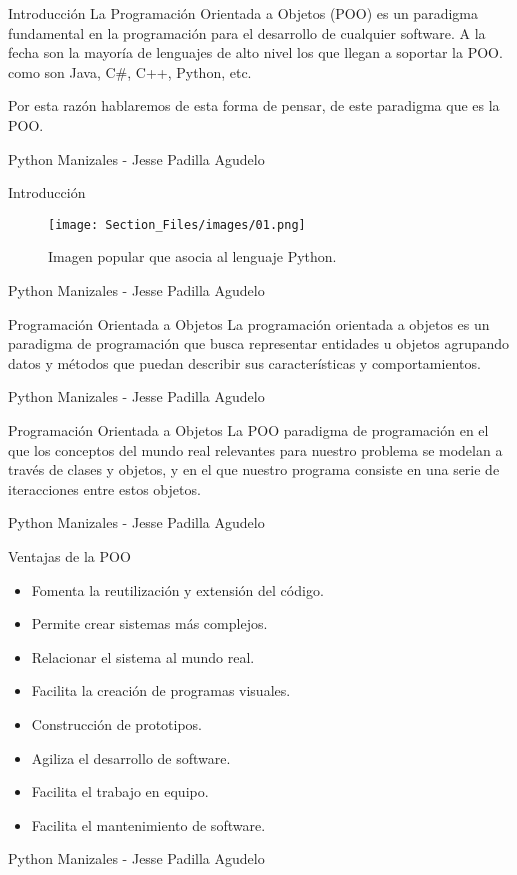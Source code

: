 \begin{frame}{Introducción}
\justifying
La Programación Orientada a Objetos (POO) es un paradigma fundamental en la programación para el desarrollo de cualquier software. A la fecha son la mayoría de lenguajes de alto nivel los que llegan a soportar la POO. como son Java, C\#, C++, Python, etc.

Por esta razón hablaremos de esta forma de pensar, de este paradigma que es la POO.

{\tiny Python Manizales - Jesse Padilla Agudelo}
\end{frame}

\begin{frame}{Introducción}
\justifying

\begin{figure}[H]
\centering
\texttt{[image: Section\_Files/images/01.png]}
\caption{Imagen popular que asocia al lenguaje Python.}
\end{figure}

{\tiny Python Manizales - Jesse Padilla Agudelo}
\end{frame}

\begin{frame}{Programación Orientada a Objetos}
\justifying
La programación orientada a objetos es un paradigma de programación que busca representar entidades u objetos agrupando datos y métodos que puedan describir sus características y comportamientos.

{\tiny Python Manizales - Jesse Padilla Agudelo}
\end{frame}

\begin{frame}{Programación Orientada a Objetos}
\justifying
La POO paradigma de programación en el que los conceptos del mundo real relevantes para nuestro problema se modelan a través de clases y objetos, y en el que nuestro programa consiste en una serie de iteracciones entre estos objetos.

{\tiny Python Manizales - Jesse Padilla Agudelo}
\end{frame}

\begin{frame}{Ventajas de la POO}
\justifying
\begin{itemize}
\item Fomenta la reutilización y extensión del código.
\item Permite crear sistemas más complejos.
\item Relacionar el sistema al mundo real.
\item Facilita la creación de programas visuales.
\item Construcción de prototipos.
\item Agiliza el desarrollo de software.
\item Facilita el trabajo en equipo.
\item Facilita el mantenimiento de software.
\end{itemize}

{\tiny Python Manizales - Jesse Padilla Agudelo}
\end{frame}

